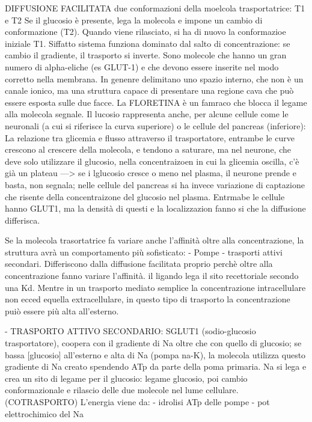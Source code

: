 \documentclass[a4paper,12pt]{article}
\begin{document}
DIFFUSIONE FACILITATA
due conformazioni della moelcola trasportatrice: T1 e T2
Se il glucosio è presente, lega la molecola e impone un cambio di conformazione (T2). Quando viene rilasciato, si ha di nuovo la conformazioe iniziale T1. Siffatto sistema funziona dominato dal salto di concentrazione: se cambio il gradiente, il trasporto si inverte.
Sono molecole che hanno un gran numero di alpha-eliche (es GLUT-1) e che devono essere inserite nel modo corretto nella membrana. In genenre delimitano uno spazio interno, che non è un canale ionico, ma una struttura capace di presentare una regione cava che può essere esposta sulle due facce. La FLORETINA è un famraco che blocca il legame alla molecola segnale.
Il lucosio rappresenta anche, per alcune cellule come le neuronali (a cui si riferisce la curva superiore) o le cellule del pancreas (inferiore):
La relazione tra glicemia e flusso attraverso il trasportatore, entrambe le curve crescono al crescere della molecola, e tendono a saturare, ma nel neurone, che deve solo utilizzare il glucosio, nella concentraizoen in cui la glicemia oscilla, c'è già un plateau ---> se i lglucosio cresce o meno nel plasma, il neurone prende e basta, non segnala; nelle cellule del pancreas si ha invece variazione di captazione che risente della concentraizone del glucosio nel plasma.
Entrmabe le cellule hanno GLUT1, ma la densità di questi e la localizzazion fanno si che la diffusione differisca.

Se la molecola trasortatrice fa variare anche l'affinità oltre alla concentrazione, la struttura avrà un comportamento più sofisticato:
- Pompe
- trasporti attivi secondari.
Differiscono dalla diffusione facilitata proprio perchè oltre alla concentrazione fanno variare l'affinità.
il ligando lega il sito recettoriale secondo una Kd. Mentre in un trasporto mediato semplice la concentrazione intracellulare non ecced equella extracellulare, in questo tipo di trasporto la concentrazione puiò essere più alta all'esterno.

- TRASPORTO ATTIVO SECONDARIO: SGLUT1 (sodio-glucosio trasportatore), coopera con il gradiente di Na oltre che con quello di glucosio; se bassa [glucosio] all'esterno e alta di Na (pompa na-K), la molecola utilizza questo gradiente di Na creato spendendo ATp da parte della poma primaria. Na si lega e crea un sito di legame per il glucosio: legame glucosio, poi cambio conformazionale e rilascio delle due molecole nel lume cellulare. (COTRASPORTO)
L'energia viene da:
- idrolisi ATp delle pompe
- pot elettrochimico del Na 
\end{document}
